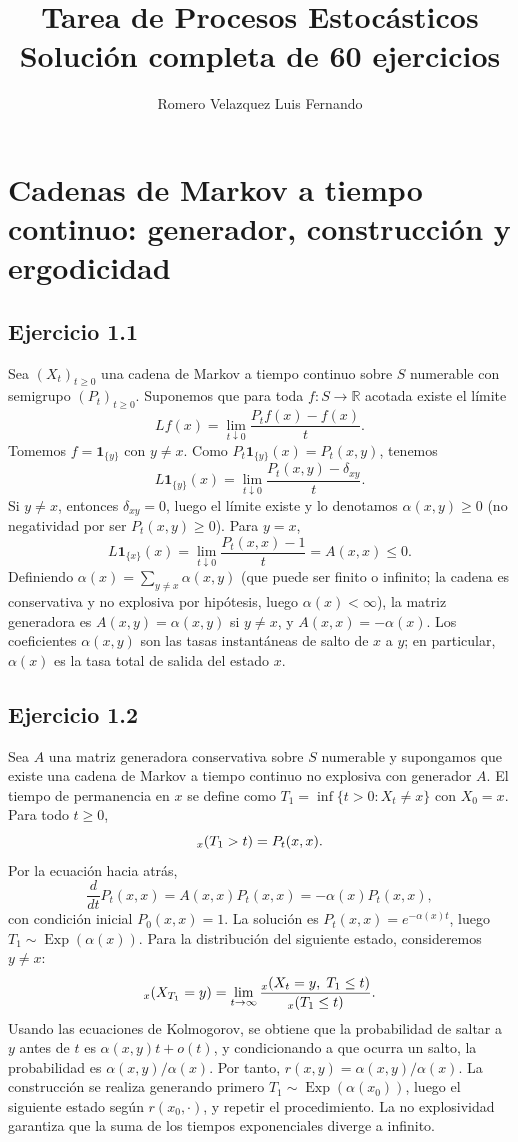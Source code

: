 \documentclass[12pt]{article}
\title{Tarea de Procesos Estoc\'asticos\\\large Soluci\'on completa de 60 ejercicios}
\author{Romero Velazquez Luis Fernando}
\date{}
\let\P\relax
\newcommand{\P}{\mathbb{P}}
\newcommand{\R}{\mathbb{R}}
\newcommand{\1}{\mathbf{1}}
\newcommand{\Exp}{\operatorname{Exp}}
\begin{document}
\maketitle
\tableofcontents

\section{Cadenas de Markov a tiempo continuo: generador, construcci\'on y ergodicidad}

\subsection{Ejercicio 1.1}
Sea $(X_t)_{t\ge0}$ una cadena de Markov a tiempo continuo sobre $S$ numerable con semigrupo $(P_t)_{t\ge0}$. Suponemos que para toda $f:S\to\R$ acotada existe el l\'imite
\[
Lf(x)=\lim_{t\downarrow0}\frac{P_tf(x)-f(x)}{t}.
\]
Tomemos $f=\1_{\{y\}}$ con $y\neq x$. Como $P_t\1_{\{y\}}(x)=P_t(x,y)$, tenemos
\[
L\1_{\{y\}}(x)=\lim_{t\downarrow0}\frac{P_t(x,y)-\delta_{xy}}{t}.
\]
Si $y\neq x$, entonces $\delta_{xy}=0$, luego el l\'imite existe y lo denotamos $\alpha(x,y)\ge0$ (no negatividad por ser $P_t(x,y)\ge0$). Para $y=x$,
\[
L\1_{\{x\}}(x)=\lim_{t\downarrow0}\frac{P_t(x,x)-1}{t}=A(x,x)\le0.
\]
Definiendo $\alpha(x)=\sum_{y\neq x}\alpha(x,y)$ (que puede ser finito o infinito; la cadena es conservativa y no explosiva por hip\'otesis, luego $\alpha(x)<\infty$), la matriz generadora es $A(x,y)=\alpha(x,y)$ si $y\neq x$, y $A(x,x)=-\alpha(x)$. Los coeficientes $\alpha(x,y)$ son las tasas instant\'aneas de salto de $x$ a $y$; en particular, $\alpha(x)$ es la tasa total de salida del estado $x$.

\subsection{Ejercicio 1.2}
Sea $A$ una matriz generadora conservativa sobre $S$ numerable y supongamos que existe una cadena de Markov a tiempo continuo no explosiva con generador $A$. El tiempo de permanencia en $x$ se define como $T_1=\inf\{t>0:X_t\neq x\}$ con $X_0=x$. Para todo $t\ge0$,
\[
\P_x(T_1>t)=P_t(x,x).
\]
Por la ecuaci\'on hacia atr\'as,
\[
\frac{d}{dt}P_t(x,x)=A(x,x)P_t(x,x)=-\alpha(x)P_t(x,x),
\]
con condici\'on inicial $P_0(x,x)=1$. La soluci\'on es $P_t(x,x)=e^{-\alpha(x)t}$, luego $T_1\sim\Exp(\alpha(x))$. Para la distribuci\'on del siguiente estado, consideremos $y\neq x$:
\[
\P_x(X_{T_1}=y)=\lim_{t\to\infty}\frac{\P_x(X_t=y,\;T_1\le t)}{\P_x(T_1\le t)}.
\]
Usando las ecuaciones de Kolmogorov, se obtiene que la probabilidad de saltar a $y$ antes de $t$ es $\alpha(x,y)t+o(t)$, y condicionando a que ocurra un salto, la probabilidad es $\alpha(x,y)/\alpha(x)$. Por tanto, $r(x,y)=\alpha(x,y)/\alpha(x)$. La construcci\'on se realiza generando primero $T_1\sim\Exp(\alpha(x_0))$, luego el siguiente estado seg\'un $r(x_0,\cdot)$, y repetir el procedimiento. La no explosividad garantiza que la suma de los tiempos exponenciales diverge a infinito.
\end{document}
